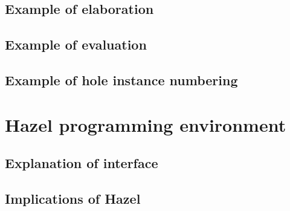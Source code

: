 \subsection{Example of elaboration}
\label{sec:elaboration_example}

\subsection{Example of evaluation}
\label{sec:evaluation_example}

\subsection{Example of hole instance numbering}
\label{sec:hole_instance_example}

\section{Hazel programming environment}
\label{sec:hazel_online}

\subsection{Explanation of interface}
\label{sec:hazel_interface}

\subsection{Implications of Hazel}
\label{sec:hazel_implications}

